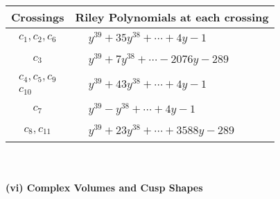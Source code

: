 \documentclass[1p]{elsarticle_modified}
\theoremstyle{definition}
\begin{document}
\begin{tabular}{m{50pt}|m{274pt}}
Crossings & \hspace{64pt}Riley Polynomials at each crossing \\
\hline $$\begin{aligned}c_{1},c_{2},c_{6}\end{aligned}$$&$\begin{aligned}
&y^{39}+35 y^{38}+\cdots+4 y-1
\end{aligned}$\\
\hline $$\begin{aligned}c_{3}\end{aligned}$$&$\begin{aligned}
&y^{39}+7 y^{38}+\cdots-2076 y-289
\end{aligned}$\\
\hline $$\begin{aligned}c_{4},c_{5},c_{9}\\c_{10}\end{aligned}$$&$\begin{aligned}
&y^{39}+43 y^{38}+\cdots+4 y-1
\end{aligned}$\\
\hline $$\begin{aligned}c_{7}\end{aligned}$$&$\begin{aligned}
&y^{39}- y^{38}+\cdots+4 y-1
\end{aligned}$\\
\hline $$\begin{aligned}c_{8},c_{11}\end{aligned}$$&$\begin{aligned}
&y^{39}+23 y^{38}+\cdots+3588 y-289
\end{aligned}$\\
\hline
\end{tabular}\\~\\
\newpage\flushleft \textbf{(vi) Complex Volumes and Cusp Shapes}
\end{document}
